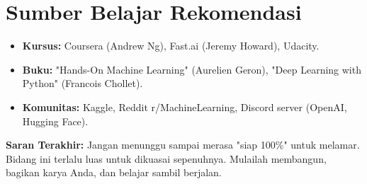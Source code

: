 \section{Sumber Belajar Rekomendasi}
\begin{itemize}
    \item \textbf{Kursus:} Coursera (Andrew Ng), Fast.ai (Jeremy Howard), Udacity.
    \item \textbf{Buku:} "Hands-On Machine Learning" (Aurelien Geron), "Deep Learning with Python" (Francois Chollet).
    \item \textbf{Komunitas:} Kaggle, Reddit r/MachineLearning, Discord server (OpenAI, Hugging Face).
\end{itemize}

\begin{tipbox}
    \textbf{Saran Terakhir:} Jangan menunggu sampai merasa "siap 100\%" untuk melamar. Bidang ini terlalu luas untuk dikuasai sepenuhnya. Mulailah membangun, bagikan karya Anda, dan belajar sambil berjalan.
\end{tipbox}
